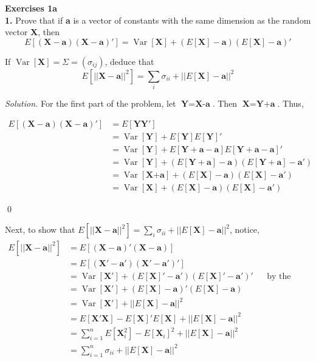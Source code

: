 \documentclass{article}
\newcommand{\Var}{\operatorname{Var}} %
\begin{document}
\setlength{\parindent}{0cm}   %



\textbf{Exercises 1a}
\\
\textbf{1.} Prove that if \textbf{a} is a vector of constants with the same dimension as the random vector \textbf{X}, then 
\[
E[(\textbf{X}-\textbf{a})(\textbf{X}-\textbf{a})'] = \Var[\textbf{X}]+(E[\textbf{X}]-\textbf{a})(E[\textbf{X}]-\textbf{a})' 
\]

If \(\Var[\textbf{X}] = \Sigma = (\sigma_{ij}) \), deduce that 
\[
E[ ||\textbf{X}-\textbf{a}||^2] = \sum_i \sigma_{ii} + ||E[\textbf{X}]-\textbf{a}||^2 
\]
\vspace{2mm}

\textit{Solution.} For the first part of the problem, let \(\textbf{Y}=\textbf{X-a}\). Then \(\textbf{X} = \textbf{Y+a}\). Thus, 

\begin{align*}
E[(\textbf{X}-\textbf{a})(\textbf{X}-\textbf{a})'] &= E[\textbf{Y}\textbf{Y}'] \\
&= \Var[\textbf{Y}] + E[\textbf{Y}]E[\textbf{Y}]'  \\
&= \Var[\textbf{Y}] + E[\textbf{Y}+\textbf{a} -\textbf{a}]E[\textbf{Y}+\textbf{a}-\textbf{a}]' \\
&= \Var[\textbf{Y}] + (E[\textbf{Y}+\textbf{a} ]-\textbf{a})(E[\textbf{Y}+\textbf{a}]-\textbf{a}') \\
&= \Var[\textbf{X+a}] + (E[\textbf{X}]-\textbf{a})(E[\textbf{X}]-\textbf{a}') \\
&= \Var[\textbf{X}] + (E[\textbf{X}]-\textbf{a})(E[\textbf{X}]-\textbf{a}')
\end{align*}

\begin{flushright}
\qed
\end{flushright}

\vspace{3mm} 
Next, to show that \(E[ ||\textbf{X}-\textbf{a}||^2] = \sum_i \sigma_{ii} + ||E[\textbf{X}]-\textbf{a}||^2 \), notice, 
\begin{align*}
 E[ ||\textbf{X}-\textbf{a}||^2] &= E[(\textbf{X} - \textbf{a})'(\textbf{X}-\textbf{a})] \\
 &= E[(\textbf{X}' - \textbf{a}')(\textbf{X}'-\textbf{a}')']   &&\\
 &= \Var[\textbf{X}'] + (E[\textbf{X}]'-\textbf{a}')(E[\textbf{X}]'-\textbf{a}')' && \text{by the identity proven above}  \\ 
 &= \Var[\textbf{X}'] + (E[\textbf{X}]-\textbf{a})'(E[\textbf{X}]-\textbf{a} ) && \\
  &= \Var[\textbf{X}'] + ||E[\textbf{X}]-\textbf{a}||^2 && \\
  &= E[\textbf{X}' \textbf{X}] - E[\textbf{X}]'E[\textbf{X}] + ||E[\textbf{X}]-\textbf{a}||^2 && \\
  &= \sum_{i=1}^n E[\textbf{X}_i^2]-E[\textbf{X}_i]^2 + ||E[\textbf{X}]-\textbf{a}||^2 && \\
  &= \sum_{i=1}^n \sigma_{ii}+ ||E[\textbf{X}]-\textbf{a}||^2 && \\
\end{align*}
\end{document}
